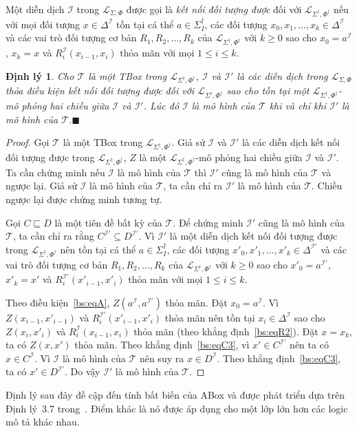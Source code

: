 \documentclass[12pt,a4paper,twoside]{report}
\newcommand{\mL}		{\mathcal{L}}
\newcommand{\mT}		{\mathcal{T}}
\newcommand{\mI}		{\mathcal{I}}
\newcommand{\SigmaDagI}	{\Sigma^\dag_I}
\newcommand{\mLSP}		{\mL_{\Sigma,\Phi}}
\newcommand{\mLSPD}		{\mL_{\Sigma^\dag,\Phi^\dag}}
\newcommand{\myend}		{\mbox{}\hfill\mbox{{\scriptsize$\!\blacksquare$}}}
\newtheorem{Theorem}{Định lý}[chapter]
\theoremstyle{definition}
\begin{document}
Một diễn dịch $\mI$ trong $\mLSP$ được gọi là {\em kết nối đối tượng được} đối với $\mLSPD$ nếu với mọi đối tượng $x \in \Delta^\mI$ tồn tại cá thể $a \in \SigmaDagI$, các đối tượng $x_0, x_1, \ldots, x_k \in \Delta^\mI$ và các vai trò đối tượng cơ bản $R_1, R_2, \ldots, R_k$ của $\mLSPD$ với $k \geq 0$ sao cho $x_0 = a^\mI$, $x_k = x$ và $R_i^{\mI}(x_{i-1}, x_i)$ thỏa mãn với mọi $1 \leq i \leq k$.

\begin{Theorem}
\label{th:Invariant2}
Cho $\mT$ là một TBox trong $\mLSPD$, $\mI$ và $\mI'$ là các diễn dịch trong $\mLSP$ thỏa điều kiện kết nối đối tượng được đối với $\mLSPD$ sao cho tồn tại một $\mLSPD$-mô phỏng hai chiều giữa $\mI$ và $\mI'$. Lúc đó $\mI$ là mô hình của $\mT$ khi và chỉ khi $\mI'$ là mô hình của $\mT$.\myend
\end{Theorem}

\begin{proof}
Gọi $\mT$ là một TBox trong $\mLSPD$. Giả sử $\mI$ và $\mI'$ là các diễn dịch kết nối đối tượng được trong $\mLSPD$, $Z$ là một $\mLSPD$-mô phỏng hai chiều giữa $\mI$ và $\mI'$. Ta cần chứng minh nếu $\mI$ là mô hình của $\mT$ thì $\mI'$ cũng là mô hình của $\mT$ và ngược lại. Giả sử $\mI$ là mô hình của $\mT$, ta cần chỉ ra $\mI'$ là mô hình của $\mT$. Chiều ngược lại được chứng minh tương tự.

Gọi $C \sqsubseteq D$ là một tiên đề bất kỳ của $\mT$. Để chứng minh $\mI'$ cũng là mô hình của $\mT$, ta cần chỉ ra rằng $C^{\mI'} \subseteq D^{\mI'}$. Vì $\mI'$ là một diễn dịch kết nối đối tượng được trong $\mLSPD$ nên tồn tại cá thể $a \in \SigmaDagI$, các đối tượng $x'_0, x'_1, \ldots, x'_k \in \Delta^{\mI'}$ và các vai trò đối tượng cơ bản $R_1, R_2, \ldots, R_k$ của $\mLSPD$ với $k \geq 0$ sao cho $x'_0 = a^{\mI'}$, $x'_k = x'$ và $R_i^{\mI'}(x'_{i-1}, x'_i)$ thỏa mãn với mọi $1 \leq i \leq k$.

Theo điều kiện~\eqref{bs:eqA}, $Z(a^\mI, a^{\mI'})$ thỏa mãn. Đặt $x_0 = a^\mI$. Vì $Z(x_{i-1},x'_{i-1})$ và $R_i^{\mI'}(x'_{i-1},x'_i)$ thỏa mãn nên tồn tại $x_i \in \Delta^\mI$ sao cho $Z(x_i, x'_i)$ và $R_i^\mI(x_{i-1}, x_i)$ thỏa mãn (theo khẳng định~\eqref{bs:eqR2}). Đặt $x=x_k$, ta có $Z(x,x')$ thỏa mãn. Theo khẳng định~\eqref{bs:eqC3}, vì $x' \in C^{\mI'}$ nên ta có $x \in C^\mI$. Vì $\mI$ là mô hình của $\mT$ nên suy ra $x \in D^\mI$. Theo khẳng định~\eqref{bs:eqC3}, ta có $x' \in D^{\mI'}$. Do vậy $\mI'$ là mô hình của $\mT$.
\end{proof}

Định lý sau đây đề cập đến tính bất biến của ABox và được phát triển dựa trên Định lý~3.7 trong~\cite{Divroodi2011B}. Điểm khác là nó được áp dụng cho một lớp lớn hơn các logic mô tả khác nhau.
\end{document}
